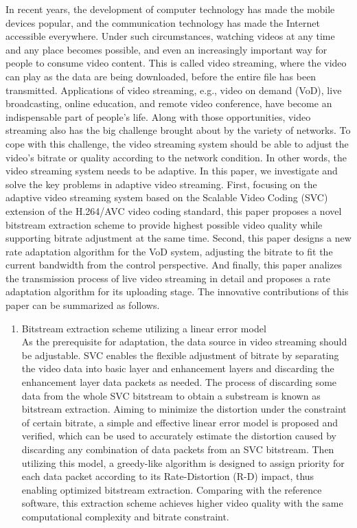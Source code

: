 \begin{eabstract}
In recent years, the development of computer technology has made the mobile devices popular, and the communication technology has made the Internet accessible everywhere. Under such circumstances, watching videos at any time and any place becomes possible, and even an increasingly important way for people to consume video content. This is called video streaming, where the video can play as the data are being downloaded, before the entire file has been transmitted. Applications of video streaming, e.g., video on demand (VoD), live broadcasting, online education, and remote video conference, have become an indispensable part of people's life. Along with those opportunities, video streaming also has the big challenge brought about by the variety of networks. To cope with this challenge, the video streaming system should be able to adjust the video’s bitrate or quality according to the network condition. In other words, the video streaming system needs to be adaptive. In this paper, we investigate and solve the key problems in adaptive video streaming. First, focusing on the adaptive video streaming system based on the Scalable Video Coding (SVC) extension of the H.264/AVC video coding standard, this paper proposes a novel bitstream extraction scheme to provide highest possible video quality while supporting bitrate adjustment at the same time. Second, this paper designs a new rate adaptation algorithm for the VoD system, adjusting the bitrate to fit the current bandwidth from the control perspective. And finally, this paper analizes the transmission process of live video streaming in detail and proposes a rate adaptation algorithm for its uploading stage. The innovative contributions of this paper can be summarized as follows.
\begin{enumerate}
\item {Bitstream extraction scheme utilizing a linear error model}\\
As the prerequisite for adaptation, the data source in video streaming should be adjustable. SVC enables the flexible adjustment of bitrate by separating the video data into basic layer and enhancement layers and discarding the enhancement layer data packets as needed. The process of discarding some data from the whole SVC bitstream to obtain a substream is known as bitstream extraction. Aiming to minimize the distortion under the constraint of certain bitrate, a simple and effective linear error model is proposed and verified, which can be used to accurately estimate the distortion caused by discarding any combination of data packets from an SVC bitstream. Then utilizing this model, a greedy-like algorithm is designed to assign priority for each data packet according to its Rate-Distortion (R-D) impact, thus enabling optimized bitstream extraction. Comparing with the reference software, this extraction scheme achieves higher video quality with the same computational complexity and bitrate constraint.

\end{enumerate}
\end{eabstract}
